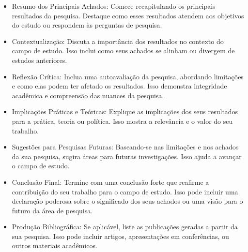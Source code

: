 	\begin{itemize}
		\item Resumo dos Principais Achados: Comece recapitulando os principais resultados da pesquisa. Destaque como esses resultados atendem aos objetivos do estudo ou respondem às perguntas de pesquisa.
		
		\item Contextualização: Discuta a importância dos resultados no contexto do campo de estudo. Isso inclui como seus achados se alinham ou divergem de estudos anteriores.
		
		\item Reflexão Crítica: Inclua uma autoavaliação da pesquisa, abordando limitações e como elas podem ter afetado os resultados. Isso demonstra integridade acadêmica e compreensão das nuances da pesquisa.
		
		\item Implicações Práticas e Teóricas: Explique as implicações dos seus resultados para a prática, teoria ou política. Isso mostra a relevância e o valor do seu trabalho.
		
		\item Sugestões para Pesquisas Futuras: Baseando-se nas limitações e nos achados da sua pesquisa, sugira áreas para futuras investigações. Isso ajuda a avançar o campo de estudo.
		
		\item Conclusão Final: Termine com uma conclusão forte que reafirme a contribuição do seu trabalho para o campo de estudo. Isso pode incluir uma declaração poderosa sobre o significado dos seus achados ou uma visão para o futuro da área de pesquisa.
		
		\item Produção Bibliográfica: Se aplicável, liste as publicações geradas a partir da sua pesquisa. Isso pode incluir artigos, apresentações em conferências, ou outros materiais acadêmicos.
	\end{itemize}
